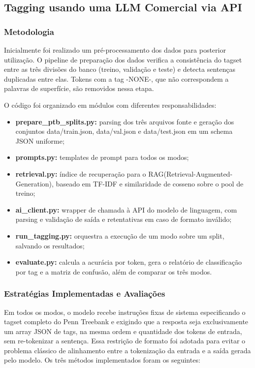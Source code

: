 \documentclass[a4paper,12pt]{article}
\begin{document}
\newpage
\subsection{Tagging usando uma LLM Comercial via API}

\subsubsection{Metodologia}

Inicialmente foi realizado um pré-processamento dos dados para posterior utilização. O pipeline de preparação dos dados verifica a consistência do tagset entre as três divisões do banco (treino, validação e teste) e detecta sentenças duplicadas entre elas. Tokens com a tag -NONE-, que não correspondem a palavras de superfície, são removidos nessa etapa.

O código foi organizado em módulos com diferentes responsabilidades:

\begin{itemize}
    \item \textbf{prepare\_ptb\_splits.py:} parsing dos três arquivos fonte e geração dos conjuntos data/train.json, data/val.json e data/test.json em um schema JSON uniforme;
    \item \textbf{prompts.py:} templates de prompt para todos os modos;
    \item \textbf{retrieval.py:} índice  de recuperação para o RAG(Retrieval-Augmented-Generation), baseado em TF-IDF e similaridade de cosseno sobre o pool de treino;
    \item \textbf{ai\_client.py:} wrapper de chamada à API do modelo de linguagem, com parsing e validação de saída e retentativas em caso de formato inválido;
    \item \textbf{run\_tagging.py:} orquestra a execução de um modo sobre um split, salvando os resultados;
    \item \textbf{evaluate.py:} calcula a acurácia por token, gera o relatório de classificação por tag e a matriz de confusão, além de comparar os três modos.
\end{itemize}

\subsubsection{Estratégias Implementadas e Avaliações}

Em todos os modos, o modelo recebe instruções fixas de sistema especificando o tagset completo do Penn Treebank e exigindo que a resposta seja exclusivamente um array JSON de tags, na mesma ordem e quantidade dos tokens de entrada, sem re-tokenizar a sentença. Essa restrição de formato foi adotada para evitar o problema clássico de alinhamento entre a tokenização da entrada e a saída gerada pelo modelo. Os três métodos implementados foram os seguintes:
\end{document}
